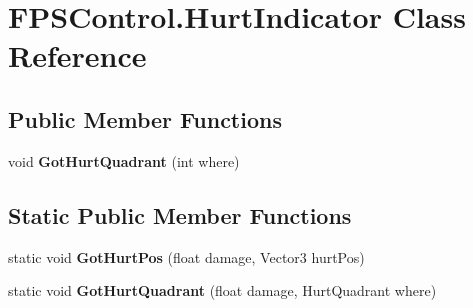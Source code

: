 \hypertarget{class_f_p_s_control_1_1_hurt_indicator}{\section{F\-P\-S\-Control.\-Hurt\-Indicator Class Reference}
\label{class_f_p_s_control_1_1_hurt_indicator}
}
\subsection*{Public Member Functions}
\begin{DoxyCompactItemize}
\item 
\hypertarget{class_f_p_s_control_1_1_hurt_indicator_a4be01509199683e58fff5a8e0856b455}{void {\bfseries Got\-Hurt\-Quadrant} (int where)}\label{class_f_p_s_control_1_1_hurt_indicator_a4be01509199683e58fff5a8e0856b455}

\end{DoxyCompactItemize}
\subsection*{Static Public Member Functions}
\begin{DoxyCompactItemize}
\item 
\hypertarget{class_f_p_s_control_1_1_hurt_indicator_a609ed90abaefd8d11bc200bb3a425659}{static void {\bfseries Got\-Hurt\-Pos} (float damage, Vector3 hurt\-Pos)}\label{class_f_p_s_control_1_1_hurt_indicator_a609ed90abaefd8d11bc200bb3a425659}

\item 
\hypertarget{class_f_p_s_control_1_1_hurt_indicator_aa67e6a9c6453169024af4b9da0d8f5e9}{static void {\bfseries Got\-Hurt\-Quadrant} (float damage, Hurt\-Quadrant where)}\label{class_f_p_s_control_1_1_hurt_indicator_aa67e6a9c6453169024af4b9da0d8f5e9}

\end{DoxyCompactItemize}
